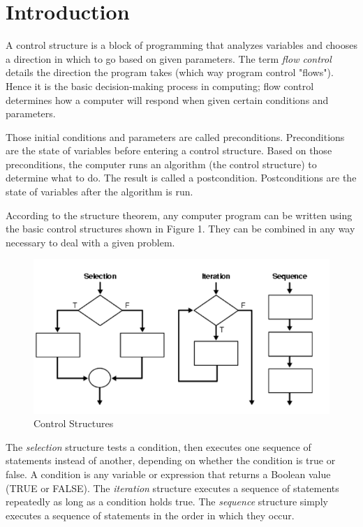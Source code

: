 \section*{Introduction}
A control structure is a block of programming that analyzes variables and chooses a direction in which to go based on given parameters. The term \textit{flow control} details the direction the program takes (which way program control "flows"). Hence it is the basic decision-making process in computing; flow control determines how a computer will respond when given certain conditions and parameters.\newline

Those initial conditions and parameters are called preconditions. Preconditions are the state of variables before entering a control structure. Based on those preconditions, the computer runs an algorithm (the control structure) to determine what to do. The result is called a postcondition. Postconditions are the state of variables after the algorithm is run. \newline

According to the structure theorem, any computer program can be written using the basic control structures shown in Figure 1. They can be combined in any way necessary to deal with a given problem.

\begin{figure}[ht!]
    \centering
	\includegraphics{images/Figure1.png}
    \caption{Control Structures}
    \label{fig1}
\end{figure}
The \textit{selection} structure tests a condition, then executes one sequence of statements instead of another, depending on whether the condition is true or false. A condition is any variable or expression that returns a Boolean value (TRUE or FALSE). The \textit{iteration} structure executes a sequence of statements repeatedly as long as a condition holds true. The \textit{sequence} structure simply executes a sequence of statements in the order in which they occur.


\clearpage